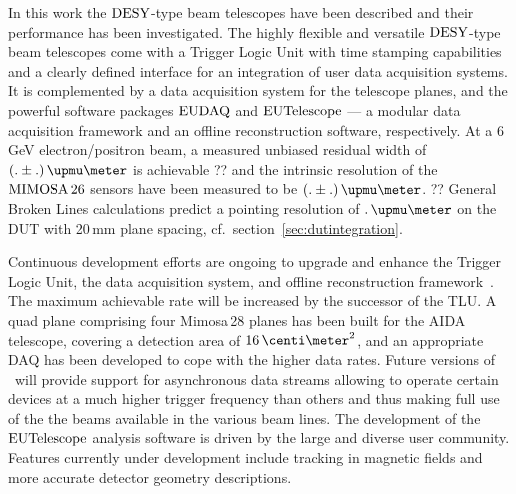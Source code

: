 

In this work the $\textrm{DESY}$-type beam telescopes have been described and their performance has been investigated. 
The highly flexible and versatile $\textrm{DESY}$-type beam telescopes come with a Trigger Logic Unit with time stamping capabilities and a clearly defined interface for an integration of user data acquisition systems.
It is complemented by a data acquisition system for the telescope planes, and the powerful software packages $\textrm{EUDAQ}$ and $\textrm{EUTelescope}$
 ---  a modular data acquisition framework and an offline reconstruction software, respectively. 
At a 6\,GeV electron/positron beam, a measured unbiased residual width of $(. \pm .)\,\upmu\meter$ is achievable ??
 and the intrinsic resolution of the $\textrm{MIMOSA\,26}$ sensors have been measured to be $(. \pm .)\,\upmu\meter$. ??
General Broken Lines calculations predict a pointing resolution of $.\,\upmu\meter$ on the DUT with 20\,mm plane spacing, cf.~section~\ref{sec:dutintegration}.

Continuous development efforts are ongoing to upgrade and enhance the Trigger Logic Unit, the data acquisition system, and offline reconstruction framework~\cite{ref:tipp2014_eudaq}.  
The maximum achievable rate will be increased by the successor of the TLU. 
A quad plane comprising four Mimosa\,28 planes has been built for the AIDA telescope, covering a detection area of $16\,\centi\meter^2$, and an appropriate DAQ has been developed to cope with the higher data rates. 
Future versions of \eudaq\ will provide support for asynchronous data streams allowing to operate certain devices at a much higher trigger frequency than others
 and thus making full use of the the beams available in the various beam lines.
The development of the $\textrm{EUTelescope}$ analysis software is driven by the large and diverse user community. 
Features currently under development include tracking in magnetic fields and more accurate detector geometry descriptions. 
